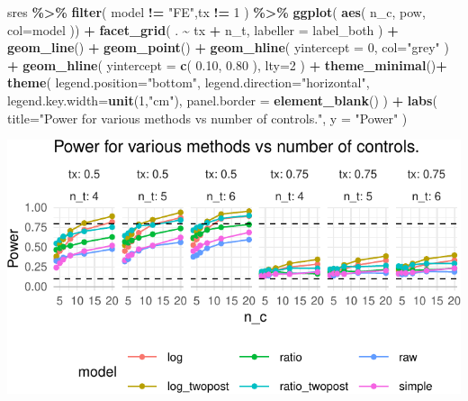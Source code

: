 \documentclass[
]{book}
\newenvironment{Shaded}{\begin{snugshade}}{\end{snugshade}}
\newcommand{\AttributeTok}[1]{\textcolor[rgb]{0.13,0.29,0.53}{#1}}
\newcommand{\DecValTok}[1]{\textcolor[rgb]{0.00,0.00,0.81}{#1}}
\newcommand{\FloatTok}[1]{\textcolor[rgb]{0.00,0.00,0.81}{#1}}
\newcommand{\FunctionTok}[1]{\textcolor[rgb]{0.13,0.29,0.53}{\textbf{#1}}}
\newcommand{\NormalTok}[1]{#1}
\newcommand{\SpecialCharTok}[1]{\textcolor[rgb]{0.81,0.36,0.00}{\textbf{#1}}}
\newcommand{\StringTok}[1]{\textcolor[rgb]{0.31,0.60,0.02}{#1}}
\begin{document}
\begin{Shaded}
\begin{Highlighting}[]
\NormalTok{sres }\SpecialCharTok{\%\textgreater{}\%} 
  \FunctionTok{filter}\NormalTok{( model }\SpecialCharTok{!=} \StringTok{"FE"}\NormalTok{,tx }\SpecialCharTok{!=} \DecValTok{1}\NormalTok{ ) }\SpecialCharTok{\%\textgreater{}\%}
  \FunctionTok{ggplot}\NormalTok{( }\FunctionTok{aes}\NormalTok{( n\_c, pow, }\AttributeTok{col=}\NormalTok{model )) }\SpecialCharTok{+}
    \FunctionTok{facet\_grid}\NormalTok{(  . }\SpecialCharTok{\textasciitilde{}}\NormalTok{ tx }\SpecialCharTok{+}\NormalTok{ n\_t, }\AttributeTok{labeller =}\NormalTok{ label\_both ) }\SpecialCharTok{+}
    \FunctionTok{geom\_line}\NormalTok{() }\SpecialCharTok{+} \FunctionTok{geom\_point}\NormalTok{() }\SpecialCharTok{+}
    \FunctionTok{geom\_hline}\NormalTok{( }\AttributeTok{yintercept =} \DecValTok{0}\NormalTok{, }\AttributeTok{col=}\StringTok{"grey"}\NormalTok{ ) }\SpecialCharTok{+}
    \FunctionTok{geom\_hline}\NormalTok{( }\AttributeTok{yintercept =} \FunctionTok{c}\NormalTok{( }\FloatTok{0.10}\NormalTok{, }\FloatTok{0.80}\NormalTok{ ), }\AttributeTok{lty=}\DecValTok{2}\NormalTok{ ) }\SpecialCharTok{+}
  \FunctionTok{theme\_minimal}\NormalTok{()}\SpecialCharTok{+} \FunctionTok{theme}\NormalTok{( }\AttributeTok{legend.position=}\StringTok{"bottom"}\NormalTok{,}
                          \AttributeTok{legend.direction=}\StringTok{"horizontal"}\NormalTok{,}
                          \AttributeTok{legend.key.width=}\FunctionTok{unit}\NormalTok{(}\DecValTok{1}\NormalTok{,}\StringTok{"cm"}\NormalTok{),}
                          \AttributeTok{panel.border =} \FunctionTok{element\_blank}\NormalTok{() ) }\SpecialCharTok{+}
  \FunctionTok{labs}\NormalTok{( }\AttributeTok{title=}\StringTok{"Power for various methods vs number of controls."}\NormalTok{,}
      \AttributeTok{y =} \StringTok{"Power"}\NormalTok{ )}
\end{Highlighting}
\end{Shaded}

\begin{center}\includegraphics[width=0.75\linewidth]{Designing-Simulations-in-R_files/figure-latex/disc_power-1} \end{center}
\end{document}
